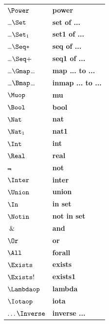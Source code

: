 \documentclass{overturerepchap}
\begin{document}
{\begin{longtable}{|l|l|}
 $\Power$          & {\bf\ttfamily power}                        \\
 \ldots$\Set$            & {\bf\ttfamily set of ...}                    \\
 \ldots$\Set_1$            & {\bf\ttfamily set1 of ...}                    \\
 \ldots$\Seq*$              & {\bf\ttfamily seq of ...}                 \\
 \ldots$\Seq+$              & {\bf\ttfamily seq1 of ...}                 \\
 \ldots$\Gmap$\ldots           & {\bf\ttfamily map ... to ...}                 \\
 \ldots$\Bmap$\ldots           & {\bf\ttfamily inmap ... to ...}                 \\
 $\Muop$           & {\bf\ttfamily mu}                           \\
 $\Bool$           & {\bf\ttfamily bool}                         \\
 $\Nat$            & {\bf\ttfamily nat}                          \\
 $\Nat_1$            & {\bf\ttfamily nat1}                          \\
 $\Int$            & {\bf\ttfamily int}                          \\
 $\Real$           & {\bf\ttfamily real}                         \\
 $\Not$            & {\bf\ttfamily not}                          \\
 $\Inter$          & {\bf\ttfamily inter}                        \\
 $\Union$          & {\bf\ttfamily union}                        \\
 $\In$             & {\bf\ttfamily in set}                       \\
 $\Notin$          & {\bf\ttfamily not in set}                   \\
 $\And$            & {\bf\ttfamily and}                          \\
 $\Or$             & {\bf\ttfamily or}                           \\
 $\All$            & {\bf\ttfamily forall}                       \\
 $\Exists$         & {\bf\ttfamily exists}                       \\
 $\Exists!$        & {\bf\ttfamily exists1}                      \\
 $\Lambdaop$       & {\bf\ttfamily lambda} \\
 $\Iotaop$         & {\bf\ttfamily iota} \\
 $\ldots\Inverse$  & {\bf\ttfamily inverse ...} \\
\hline
\end{longtable}

}
\end{document}
